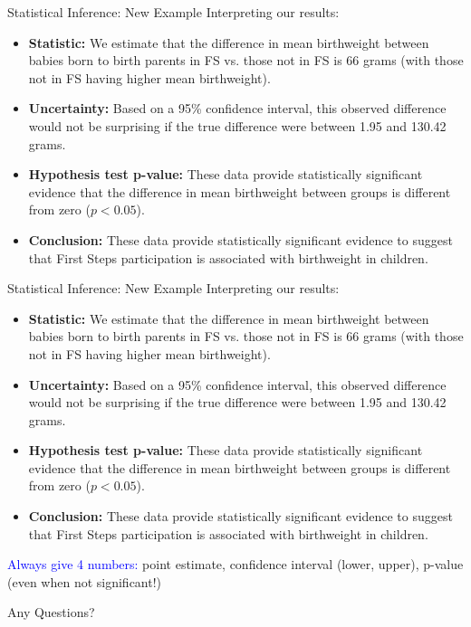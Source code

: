\documentclass[10pt,t]{beamer}
\begin{document}
\begin{frame}{Statistical Inference: New Example}
Interpreting our results:

\vspace{0.3cm}

\begin{itemize}
	\item \textbf{Statistic:} We estimate that the difference in mean birthweight between babies born to birth parents in FS vs. those not in FS is 66 grams (with those not in FS having higher mean birthweight).
	\item \textbf{Uncertainty:} Based on a 95\% confidence interval, this observed difference would not be surprising if the true difference were between 1.95 and 130.42 grams.
	\item \textbf{Hypothesis test p-value:} These data provide statistically significant evidence that the difference in mean birthweight between groups is different from zero ($p < 0.05$).
	\item \textbf{Conclusion:} These data provide statistically significant evidence to suggest that First Steps participation is associated with birthweight in children.
\end{itemize}

\end{frame}

\begin{frame}{Statistical Inference: New Example}
Interpreting our results:

\vspace{0.3cm}

\begin{itemize}
	\item \textbf{Statistic:} We estimate that the difference in mean birthweight between babies born to birth parents in FS vs. those not in FS is 66 grams (with those not in FS having higher mean birthweight).
	\item \textbf{Uncertainty:} Based on a 95\% confidence interval, this observed difference would not be surprising if the true difference were between 1.95 and 130.42 grams.
	\item \textbf{Hypothesis test p-value:} These data provide statistically significant evidence that the difference in mean birthweight between groups is different from zero ($p < 0.05$).
	\item \textbf{Conclusion:} These data provide statistically significant evidence to suggest that First Steps participation is associated with birthweight in children.
\end{itemize}

\vspace{0.1cm}

\textcolor{blue}{Always give 4 numbers:} point estimate, confidence interval (lower, upper), p-value (even when not significant!)

\end{frame}

\begin{frame}[c]
\centering \huge Any Questions?
\end{frame}
\end{document}
